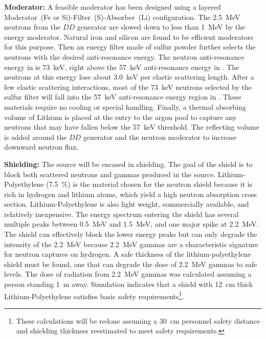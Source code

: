 {\bf Moderator:}  A feasible moderator has been designed using a layered Moderator~(Fe or Si)-Filter~(S)-Absorber~(Li) %
configuration. The \SI{2.5}{\MeV} neutrons from the $DD$ generator are slowed down to less than \SI{1}{\MeV} by the energy moderator. Natural iron and silicon are found to be efficient moderators for this purpose. Then an energy filter made of sulfur powder further selects the neutrons with the desired anti-resonance energy.
The neutron anti-resonance energy in  is \SI{73}{\keV}, right above the \SI{57}{\keV} anti-resonance energy in . The neutrons at this energy lose about \SI{3.0}{\keV} per elastic scattering length. After a few elastic scattering interactions, most of the \SI{73}{\keV} neutrons selected by the sulfur filter will fall into the \SI{57}{\keV} anti-resonance energy region in . These materials require no cooling or special handling. Finally, a thermal absorbing volume of Lithium is placed at the entry to the argon pool to capture any neutrons that may have fallen below the \SI{57}{\keV} threshold. The reflecting volume is added around the $DD$ generator and the neutron moderator to increase downward neutron flux. %


{\bf Shielding:} The source will be encased in shielding. The goal of the shield is to block both scattered neutrons and gammas produced in the source. Lithium-Polyethylene (\SI{7.5}{\%}) is the material chosen for the neutron shield because it is rich in hydrogen and lithium atoms, which yield a high neutron absorption cross section. Lithium-Polyethylene is also light weight, commercially available, and relatively inexpensive. The energy spectrum entering the shield has several multiple peaks between \SI{0.5}{\MeV} and \SI{1.5}{\MeV}, and one major spike at \SI{2.2}{\MeV}. The shield can effectively block the lower energy peaks but can only degrade the intensity of the \SI{2.2}{\MeV} because \SI{2.2}{\MeV} gammas are a characteristic signature for neutron captures on hydrogen. A safe thickness of the lithium-polyethylene shield must be found, one that can degrade the dose of \SI{2.2}{\MeV} gammas to safe levels. The dose of radiation from \SI{2.2}{\MeV} gammas was calculated assuming a person standing \SI{1}{\m} away. Simulation indicates that a shield with \SI{12}{\cm} thick Lithium-Polyethylene satisfies basic safety requirements\footnote{These calculations will be redone assuming a \SI{30}{\cm} personnel safety distance and shielding thickness reestimated to meet  safety requirements.}. 

